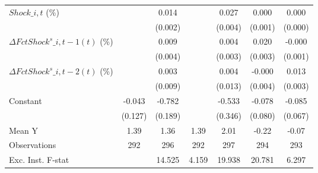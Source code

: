 {\begin{tabular}{l*{6}{c}}
\addlinespace
$ Shock\_{i,t}$ (\%) &                     &       0.014\sym{***}&                     &       0.027\sym{***}&       0.000         &       0.000         \\
                    &                     &     (0.002)         &                     &     (0.004)         &     (0.001)         &     (0.000)         \\
\addlinespace
$ \Delta FctShock^s\_{i,t-1}(t)$ (\%)&                     &       0.009\sym{*}  &                     &       0.004         &       0.020\sym{***}&      -0.000         \\
                    &                     &     (0.004)         &                     &     (0.003)         &     (0.003)         &     (0.001)         \\
\addlinespace
$ \Delta FctShock^s\_{i,t-2}(t)$ (\%)&                     &       0.003         &                     &       0.004         &      -0.000         &       0.013\sym{***}\\
                    &                     &     (0.009)         &                     &     (0.013)         &     (0.004)         &     (0.003)         \\
\addlinespace
Constant            &      -0.043         &      -0.782\sym{***}&                     &      -0.533         &      -0.078         &      -0.085         \\
                    &     (0.127)         &     (0.189)         &                     &     (0.346)         &     (0.080)         &     (0.067)         \\
\midrule
Mean Y              &        1.39         &        1.36         &        1.39         &        2.01         &       -0.22         &       -0.07         \\
Observations        &         292         &         296         &         292         &         297         &         294         &         293         \\
Exc. Inst. F-stat   &                     &      14.525         &       4.159         &      19.938         &      20.781         &       6.297         \\
\bottomrule
\end{tabular}
}
